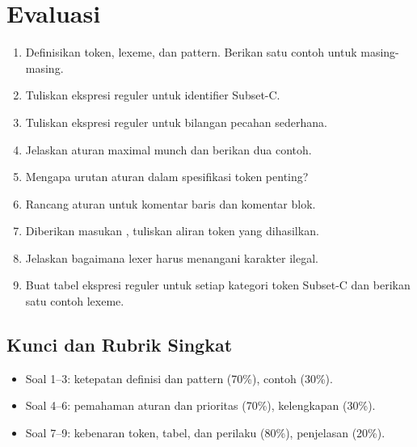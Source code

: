 \section*{Evaluasi}

\begin{enumerate}[label=\arabic*.,leftmargin=*]
  \item Definisikan token, lexeme, dan pattern. Berikan satu contoh
        untuk masing-masing.
  \item Tuliskan ekspresi reguler untuk identifier Subset-C.
  \item Tuliskan ekspresi reguler untuk bilangan pecahan sederhana.
  \item Jelaskan aturan maximal munch dan berikan dua contoh.
  \item Mengapa urutan aturan dalam spesifikasi token penting?
  \item Rancang aturan untuk komentar baris dan komentar blok.
  \item Diberikan masukan , tuliskan aliran token yang
        dihasilkan.
  \item Jelaskan bagaimana lexer harus menangani karakter ilegal.
  \item Buat tabel ekspresi reguler untuk setiap kategori token
        Subset-C dan berikan satu contoh lexeme.
\end{enumerate}

\subsection*{Kunci dan Rubrik Singkat}
\begin{itemize}[leftmargin=*]
  \item Soal 1--3: ketepatan definisi dan pattern (70\%),
        contoh (30\%).
  \item Soal 4--6: pemahaman aturan dan prioritas (70\%),
        kelengkapan (30\%).
  \item Soal 7--9: kebenaran token, tabel, dan perilaku (80\%),
        penjelasan (20\%).
\end{itemize}
